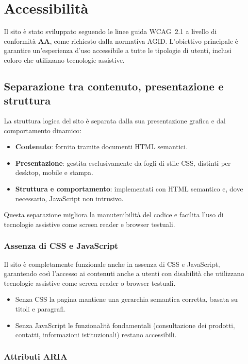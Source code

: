  \section{Accessibilità}

Il sito è stato sviluppato seguendo le linee guida WCAG~2.1 a livello di conformità \textbf{AA}, come richiesto dalla normativa AGID. L’obiettivo principale è garantire un’esperienza d’uso accessibile a tutte le tipologie di utenti, inclusi coloro che utilizzano tecnologie assistive.

\subsection{Separazione tra contenuto, presentazione e struttura}

La struttura logica del sito è separata dalla sua presentazione grafica e dal comportamento dinamico:
\begin{itemize}
  \item \textbf{Contenuto}: fornito tramite documenti HTML semantici.
  \item \textbf{Presentazione}: gestita esclusivamente da fogli di stile CSS, distinti per desktop, mobile e stampa.
  \item \textbf{Struttura e comportamento}: implementati con HTML semantico e, dove necessario, JavaScript non intrusivo.
\end{itemize}
Questa separazione migliora la manutenibilità del codice e facilita l’uso di tecnologie assistive come screen reader e browser testuali.

\subsubsection{Assenza di CSS e JavaScript}
Il sito è completamente funzionale anche in assenza di CSS e JavaScript, garantendo così l'accesso ai contenuti anche a utenti con disabilità che utilizzano tecnologie assistive come screen reader o browser testuali.
\begin{itemize}
  \item Senza CSS la pagina mantiene una gerarchia semantica corretta, basata su titoli e paragrafi.
  \item Senza JavaScript le funzionalità fondamentali (consultazione dei prodotti, contatti, informazioni istituzionali) restano accessibili.
\end{itemize}


\subsubsection{Attributi ARIA}

